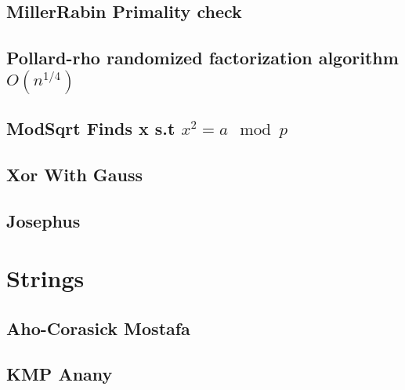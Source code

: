 \subsection{MillerRabin Primality check}
\vspace{-2ex}
\raggedbottom
\vspace{-3.2ex}
\hrulefill
\subsection{Pollard-rho randomized factorization algorithm ${O(n^{1/4})}$}
\vspace{-2ex}
\raggedbottom
\vspace{-3.2ex}
\hrulefill
\subsection{ModSqrt Finds x s.t ${x^2 = a \mod p}$}
\vspace{-2ex}
\raggedbottom
\vspace{-3.2ex}
\hrulefill
\subsection{Xor With Gauss}
\vspace{-2ex}
\raggedbottom
\vspace{-3.2ex}
\hrulefill
\subsection{Josephus}
\vspace{-2ex}
\raggedbottom
\vspace{-3.2ex}
\hrulefill

\section{Strings}
\subsection{Aho-Corasick Mostafa}
\vspace{-2ex}
\raggedbottom
\vspace{-3.2ex}
\hrulefill
\subsection{KMP Anany}
\vspace{-2ex}
\raggedbottom
\vspace{-3.2ex}
\hrulefill
